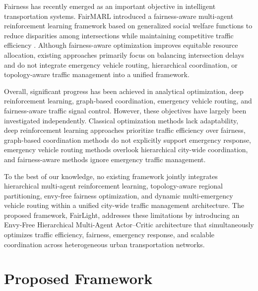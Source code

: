 \documentclass[3p,times]{elsarticle}
\theoremstyle{plain}
\theoremstyle{definition}
\begin{document}
Fairness has recently emerged as an important objective in intelligent
transportation systems. FairMARL introduced a fairness-aware
multi-agent reinforcement learning framework based on generalized
social welfare functions to reduce disparities among intersections
while maintaining competitive traffic efficiency \cite{fairmarl}.
Although fairness-aware optimization improves equitable resource
allocation, existing approaches primarily focus on balancing
intersection delays and do not integrate emergency vehicle routing,
hierarchical coordination, or topology-aware traffic management into
a unified framework.

Overall, significant progress has been achieved in analytical
optimization, deep reinforcement learning, graph-based coordination,
emergency vehicle routing, and fairness-aware traffic signal control.
However, these objectives have largely been investigated independently.
Classical optimization methods lack adaptability, deep reinforcement
learning approaches prioritize traffic efficiency over fairness,
graph-based coordination methods do not explicitly support emergency
response, emergency vehicle routing methods overlook hierarchical
city-wide coordination, and fairness-aware methods ignore emergency
traffic management.

To the best of our knowledge, no existing framework jointly integrates
hierarchical multi-agent reinforcement learning,
topology-aware regional partitioning, envy-free fairness optimization,
and dynamic multi-emergency vehicle routing within a unified
city-wide traffic management architecture. The proposed framework,
FairLight, addresses these limitations by introducing an
Envy-Free Hierarchical Multi-Agent Actor--Critic architecture
that simultaneously optimizes traffic efficiency, fairness, emergency
response, and scalable coordination across heterogeneous urban
transportation networks.



\section{Proposed Framework}\label{sec3}
\end{document}

